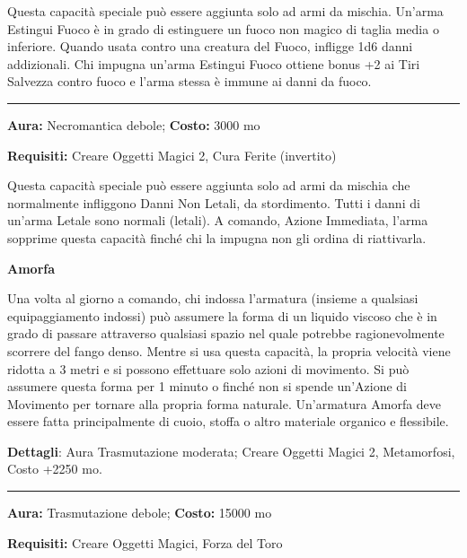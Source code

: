 \documentclass[a4paper,twoside,openany]{book}
\begin{document}
Questa capacità speciale può essere aggiunta solo ad armi da mischia. Un'arma Estingui Fuoco è in grado di estinguere un fuoco non magico di taglia media o inferiore. Quando usata contro una creatura del Fuoco, infligge 1d6 danni addizionali. Chi impugna un'arma Estingui Fuoco ottiene bonus +2 ai Tiri Salvezza contro fuoco e l'arma stessa è immune ai danni da fuoco.

\smallskip\noindent\rule{\linewidth}{2pt}  \hypertarget{Letale}{}\medskip{}\noindent\label{Letale}

\textbf{Aura:} Necromantica debole; \textbf{Costo:} 3000 mo

\textbf{Requisiti:} Creare Oggetti Magici 2, Cura Ferite (invertito)

Questa capacità speciale può essere aggiunta solo ad armi da mischia che normalmente infliggono Danni Non Letali, da stordimento. Tutti i danni di un'arma Letale sono normali (letali). A comando, Azione Immediata, l'arma sopprime questa capacità finché chi la impugna non gli ordina di riattivarla.

\smallskip* \textbf{Amorfa}\hypertarget{Amorfa}{}

Una volta al giorno a comando, chi indossa l'armatura (insieme a qualsiasi equipaggiamento indossi) può assumere la forma di un liquido viscoso che è in grado di passare attraverso qualsiasi spazio nel quale potrebbe ragionevolmente scorrere del fango denso. Mentre si usa questa capacità, la propria velocità viene ridotta a 3 metri e si possono effettuare solo azioni di movimento. Si può assumere questa forma per 1 minuto o finché non si spende un'Azione di Movimento per tornare alla propria forma naturale. Un'armatura Amorfa deve essere fatta principalmente di cuoio, stoffa o altro materiale organico e flessibile.

\textbf{Dettagli}: Aura Trasmutazione moderata; Creare Oggetti Magici 2, Metamorfosi, Costo +2250 mo.

\smallskip\noindent\rule{\linewidth}{2pt}  \hypertarget{Attaccabrighe}{}\medskip{}\noindent\label{Attaccabrighe}

\textbf{Aura:} Trasmutazione debole; \textbf{Costo:} 15000 mo

\textbf{Requisiti:} Creare Oggetti Magici, Forza del Toro

\end{document}

